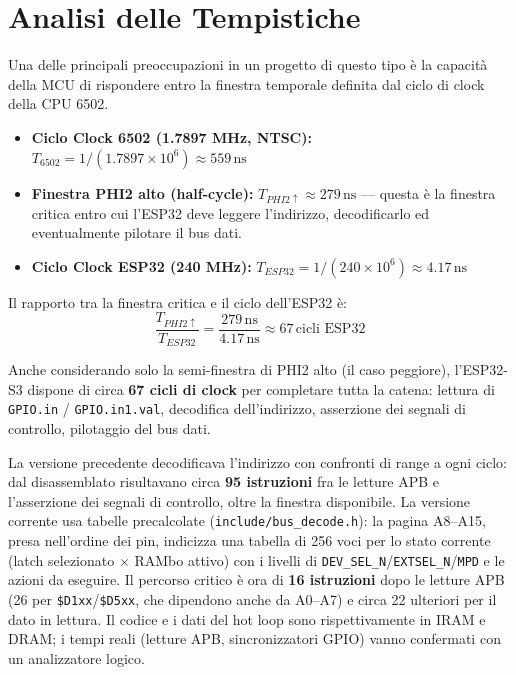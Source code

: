 \documentclass[12pt, a4paper]{article}
\begin{document}
\section{Analisi delle Tempistiche}
Una delle principali preoccupazioni in un progetto di questo tipo è la capacità della MCU di rispondere entro la finestra temporale definita dal ciclo di clock della CPU 6502.

\begin{itemize}
    \item {\bfseries Ciclo Clock 6502 (1.7897 MHz, NTSC):} $T_{6502} = 1 / (1.7897 \times 10^6) \approx 559\,\text{ns}$
    \item {\bfseries Finestra PHI2 alto (half-cycle):} $T_{PHI2\uparrow} \approx 279\,\text{ns}$ — questa è la finestra critica entro cui l'ESP32 deve leggere l'indirizzo, decodificarlo ed eventualmente pilotare il bus dati.
    \item {\bfseries Ciclo Clock ESP32 (240 MHz):} $T_{ESP32} = 1 / (240 \times 10^6) \approx 4.17\,\text{ns}$
\end{itemize}

Il rapporto tra la finestra critica e il ciclo dell'ESP32 è:
\[
\frac{T_{PHI2\uparrow}}{T_{ESP32}} = \frac{279\,\text{ns}}{4.17\,\text{ns}} \approx 67\,\text{cicli ESP32}
\]

Anche considerando solo la semi-finestra di PHI2 alto (il caso peggiore), l'ESP32-S3 dispone di circa \textbf{67 cicli di clock} per completare tutta la catena: lettura di \texttt{GPIO.in} / \texttt{GPIO.in1.val}, decodifica dell'indirizzo, asserzione dei segnali di controllo, pilotaggio del bus dati.

La versione precedente decodificava l'indirizzo con confronti di range a ogni ciclo: dal disassemblato risultavano circa \textbf{95 istruzioni} fra le letture APB e l'asserzione dei segnali di controllo, oltre la finestra disponibile. La versione corrente usa tabelle precalcolate (\texttt{include/bus\_decode.h}): la pagina A8--A15, presa nell'ordine dei pin, indicizza una tabella di 256 voci per lo stato corrente (latch selezionato $\times$ RAMbo attivo) con i livelli di \texttt{DEV\_SEL\_N}/\texttt{EXTSEL\_N}/\texttt{MPD} e le azioni da eseguire. Il percorso critico è ora di \textbf{16 istruzioni} dopo le letture APB (26 per \texttt{\$D1xx}/\texttt{\$D5xx}, che dipendono anche da A0--A7) e circa 22 ulteriori per il dato in lettura. Il codice e i dati del hot loop sono rispettivamente in IRAM e DRAM; i tempi reali (letture APB, sincronizzatori GPIO) vanno confermati con un analizzatore logico.
\end{document}
